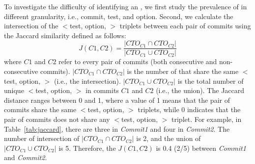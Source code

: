 To investigate the difficulty of identifying an \inconsistent, we first study the prevalence of \inconsistent in different granularity, i.e., commit, test, and option. 
Second, we calculate the intersection of the $<$test, option, \inconsistent$>$ triplets between each pair of commits %
using the Jaccard similarity defined as follows:
\begin{equation}
J(C1,C2) = \frac{|CTO_{C1} \cap CTO_{C2}|}{|CTO_{C1} \cup CTO_{C2}|}
\end{equation} 
where $C1$ and $C2$ refer to every pair of commits (both consecutive and non-consecutive commits). $|CTO_{C1} \cap CTO_{C2}|$ is the number of \instance that share the same $<$test, option, \inconsistent$>$ (i.e., the intersection). $|CTO_{C1} \cup CTO_{C2}|$ is the total number of unique $<$test, option, \inconsistent$>$ in commits $C1$ and $C2$ (i.e., the union). %
The Jaccard distance ranges %
between 0 %
and 1, where a value of 1 means that the pair of commits share the same $<$test, option, \inconsistent$>$ triplets, while 0 indicates that the pair of commits does not share any $<$test, option, \inconsistent$>$ triplet. For example, in Table~\ref{tab:jaccard}, there are three \instance in \emph{Commit1} and four \instance in \emph{Commit2}. The number of intersection of $|CTO_{C1} \cap CTO_{C2}|$ is 2, and the union of $|CTO_{C1} \cup CTO_{C2}|$ is 5. Therefore, the $J(C1,C2)$ is 0.4 (2/5) between \emph{Commit1} and \emph{Commit2}. %


